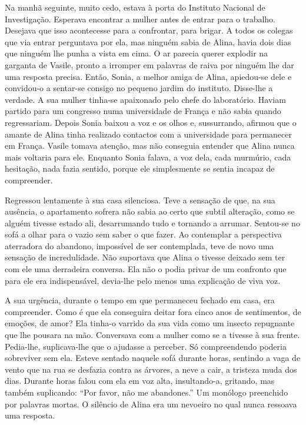Na manhã seguinte, muito cedo, estava à porta do Instituto Nacional de
Investigação. Esperava encontrar a mulher antes de entrar para o
trabalho. Desejava que isso acontecesse para a confrontar, para brigar.
A todos os colegas que via entrar perguntava por ela, mas ninguém sabia
de Alina, havia dois dias que ninguém lhe punha a vista em cima. O ar
parecia querer explodir na garganta de Vasile, pronto a irromper em
palavras de raiva por ninguém lhe dar uma resposta precisa. Então,
Sonia, a melhor amiga de Alina, apiedou-se dele e convidou-o a sentar-se
consigo no pequeno jardim do instituto. Disse-lhe a verdade. A sua
mulher tinha-se apaixonado pelo chefe do laboratório. Haviam partido
para um congresso numa universidade de França e não sabia quando
regressariam. Depois Sonia baixou a voz e os olhos e, sussurrando, afirmou que o amante de Alina tinha realizado contactos com a universidade
para permanecer em França. Vasile tomava atenção, mas não conseguia
entender que Alina nunca mais voltaria para ele. Enquanto Sonia falava,
a voz dela, cada murmúrio, cada hesitação, nada fazia sentido, porque
ele simplesmente se sentia incapaz de compreender.

Regressou lentamente à sua casa silenciosa. Teve a sensação de que, na sua ausência, o apartamento sofrera não sabia ao certo
que subtil alteração, como se alguém tivesse estado ali, desarrumando
tudo e tornando a arrumar. Sentou-se no sofá a olhar para o vazio sem
saber o que fazer. Ao contemplar a perspectiva aterradora do abandono,
impossível de ser contemplada, teve de novo uma
sensação de incredulidade. Não suportava que Alina o tivesse deixado sem
ter com ele uma derradeira conversa. Ela não o podia privar de um
confronto que para ele era indispensável, devia-lhe pelo menos uma
explicação de viva voz.

A sua urgência, durante o tempo em que permaneceu fechado em casa, era
compreender. Como é que ela conseguira deitar fora cinco anos de
sentimentos, de emoções, de amor? Ela tinha-o varrido da sua vida como
um insecto repugnante que lhe pousara na mão. Conversava com a mulher
como se a tivesse à sua frente. Pedia-lhe, suplicava-lhe que o ajudasse a perceber. Só compreendendo poderia sobreviver sem
ela. Esteve sentado naquele sofá durante horas, sentindo a vaga de vento
que na rua se desfazia contra as árvores, a neve a cair, a tristeza muda
dos dias. Durante horas falou com ela em voz alta, insultando-a,
gritando, mas também suplicando: ``Por favor, não me abandones.'' Um
monólogo preenchido por palavras mortas. O silêncio de Alina era um
nevoeiro no qual nunca ressoava uma resposta.

